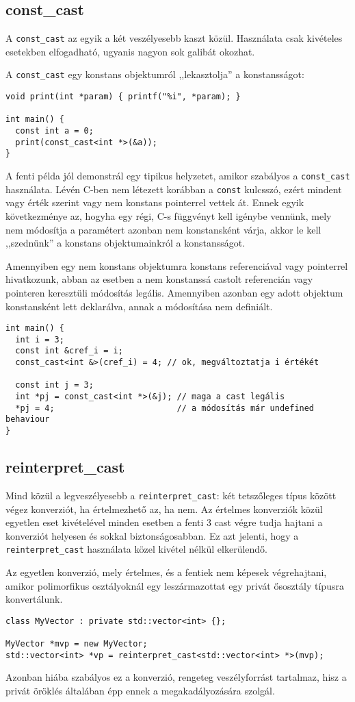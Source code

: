 \documentclass[../cpp_book/cpp_book.tex]{subfiles}
\begin{document}
	\subsection{const\_cast}
	A \texttt{const\_cast} az egyik a két veszélyesebb kaszt közül. Használata csak kivételes esetekben elfogadható, ugyanis nagyon sok galibát okozhat. 
	
	A \texttt{const\_cast} egy konstans objektumról ,,lekasztolja'' a konstansságot:
	\begin{lstlisting}
void print(int *param) { printf("%i", *param); }

int main() {
  const int a = 0;
  print(const_cast<int *>(&a));
}
	\end{lstlisting}
	A fenti példa jól demonstrál egy tipikus helyzetet, amikor szabályos a \texttt{const\_cast} használata. Lévén C-ben nem létezett korábban a \texttt{const} kulcsszó, ezért mindent vagy érték szerint vagy nem konstans pointerrel vettek át. Ennek egyik következménye az, hogyha egy régi, C-s függvényt kell igénybe vennünk, mely nem módosítja a paramétert azonban nem konstansként várja, akkor le kell ,,szednünk'' a konstans objektumainkról a konstansságot.
	
	\smallskip
	Amennyiben egy nem konstans objektumra konstans referenciával vagy pointerrel hivatkozunk, abban az esetben a nem konstanssá castolt referencián vagy pointeren keresztüli módosítás legális. Amennyiben azonban egy adott objektum konstansként lett deklarálva, annak a módosítása nem definiált.
	\begin{lstlisting}
int main() {
  int i = 3;
  const int &cref_i = i;
  const_cast<int &>(cref_i) = 4; // ok, megváltoztatja i értékét

  const int j = 3;
  int *pj = const_cast<int *>(&j); // maga a cast legális
  *pj = 4;                         // a módosítás már undefined behaviour
}
	\end{lstlisting}
	\subsection{reinterpret\_cast}
	Mind közül a legveszélyesebb a \texttt{reinterpret\_cast}: két tetszőleges típus között végez konverziót, ha értelmezhető az, ha nem. Az értelmes konverziók közül egyetlen eset kivételével minden esetben a fenti 3 cast végre tudja hajtani a konverziót helyesen és sokkal biztonságosabban. Ez azt jelenti, hogy a \texttt{reinterpret\_cast} használata közel kivétel nélkül elkerülendő.
	
	\smallskip
	Az egyetlen konverzió, mely értelmes, és a fentiek nem képesek végrehajtani, amikor polimorfikus osztályoknál egy leszármazottat egy privát ősosztály típusra konvertálunk.
	\begin{lstlisting}
class MyVector : private std::vector<int> {};

MyVector *mvp = new MyVector;
std::vector<int> *vp = reinterpret_cast<std::vector<int> *>(mvp);
	\end{lstlisting}
	Azonban hiába szabályos ez a konverzió, rengeteg veszélyforrást tartalmaz, hisz a privát öröklés általában épp ennek a megakadályozására szolgál.
\end{document}
